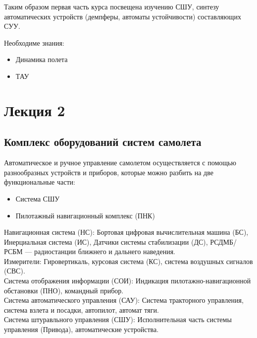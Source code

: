 \documentclass{article}
\begin{document}
Таким образом первая часть курса посвещена изучению СШУ, синтезу автоматических устройств (демпферы, автоматы устойчивости) составляющих СУУ.

Необходиме знания:
\begin{itemize}
  \item Динамика полета
  \item ТАУ
\end{itemize}
\newpage

\section{Лекция 2}
\subsection{Комплекс оборудований систем самолета}

Автоматическое и ручное управление самолетом осуществляется с помощью разнообразных устройств и приборов, которые можно разбить на две функциональные части:
\begin{itemize}
\item{Система СШУ}
\item{Пилотажный навигационный комплекс (ПНК)}
\end{itemize}

Навигационная система (НС): Бортовая цифровая вычислительная машина (БС), Инерциальная система (ИС), Датчики системы стабилизации (ДС), РСДМБ/РСБМ --- радиостанции ближнего и дальнего наведения. \\
Измерители: Гировертикаль, курсовая система (КС), система воздушных сигналов (СВС).\\
Система отображения информации (СОИ): Индикация пилотажно-навигационной обстановки (ПНО), командный прибор.\\
Система автоматического управления (САУ): Система тракторного управления, система взлета и посадки, автопилот, автомат тяги.\\
Система штуравльного управления (СШУ): Исполнительная часть системы управления (Привода), автоматические устройства.
\end{document}
